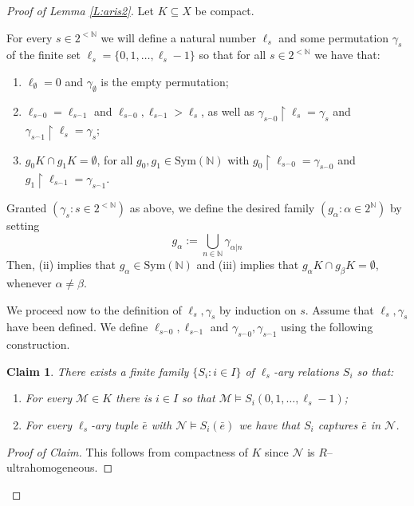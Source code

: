 \documentclass[11pt]{amsart}
\theoremstyle{plain}
\newtheorem{claim}[theorem]{Claim}
\theoremstyle{definition}
\begin{document}
\begin{proof}[Proof of Lemma \ref{L:aris2}]
Let $K\subseteq X$ be compact. 

For every $s\in 2^{<\mathbb{N}}$ we will define a natural number $\ell_s$ and some permutation $\gamma_s$ of the finite set $\ell_s=\{0,1,\ldots,\ell_s-1\}$ so that for all $s\in 2^{<\mathbb{N}}$ we have that:
\begin{enumerate}
    \item[(i)]  $\ell_{\emptyset}=0$ and $\gamma_{\emptyset}$ is the empty permutation;
    \item[(ii)] $\ell_{s^{\frown}0}= \ell_{s^{\frown}1}$  and 
    $\ell_{s^{\frown}0},\ell_{s^{\frown}1}> \ell_s$, as well as $\gamma_{s^{\frown}0}\upharpoonright \ell_s=\gamma_s$ and $\gamma_{s^{\frown}1}\upharpoonright \ell_s=\gamma_s$;
    \item[(iii)] $g_0K\cap g_1 K=\emptyset$, for all $g_0,g_1\in \mathrm{Sym}(\mathbb{N})$ with $g_0\upharpoonright \ell_{s^{\frown}0}=\gamma_{s^{\frown}0}$ and $g_1\upharpoonright \ell_{s^{\frown}1}=\gamma_{s^{\frown}1}$.
\end{enumerate}


Granted $(\gamma_s\colon s\in 2^{<\mathbb{N}})$ as above, we define the desired family $(g_{\alpha}\colon \alpha\in 2^{\mathbb{N}})$ by setting
\[g_{\alpha}:=\bigcup_{n\in\mathbb{N}} \gamma_{\alpha|n}\]
Then, (ii) implies that $g_{\alpha}\in \mathrm{Sym}(\mathbb{N})$ and (iii) implies that $g_{\alpha} K \cap g_{\beta} K =\emptyset$, whenever $\alpha\neq \beta$.

We proceed now to the definition of $\ell_s,\gamma_s$ by induction on $s$. Assume that $\ell_s, \gamma_s$ have been defined. We define $\ell_{s^{\frown}0},\ell_{s^{\frown}1}$ and $ \gamma_{s^{\frown}0}, \gamma_{s^{\frown}1}$ using the following construction.

\begin{claim}\label{Claim:1in}
There exists a finite family  $\{S_i\colon i\in I\}$ of  $\ell_s$-ary relations $S_i$ so that:
\begin{enumerate}
    \item[(I)] For every $\mathcal{M}\in K$ there is $i\in I$ so that $\mathcal{M}\models S_i(0,1,\ldots,\ell_s-1)$;
    \item[(II)] For every $\ell_s$-ary tuple $\bar{e}$ with $\mathcal{N}\models S_i(\bar{e})$ we have that $S_i$ captures  $\bar{e}$ in $\mathcal{N}$.
\end{enumerate}
\end{claim}
\begin{proof}[Proof of Claim]
 This follows from compactness of $K$ since $\mathcal{N}$ is $R$--ultrahomogeneous.
\end{proof}



\end{proof}
\end{document}
